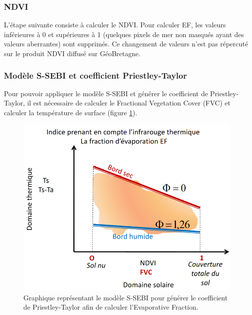 \documentclass[10pt,a4paper]{article}
\begin{document}
\subsubsection{NDVI}

L'étape suivante consiste à calculer le NDVI. Pour calculer EF, les valeurs inférieures à 0 et supérieures à 1 (quelques pixels de mer non masqués ayant des valeurs aberrantes) sont supprimés. Ce changement de valeurs n'est pas répercuté sur le produit NDVI diffusé sur GéoBretagne.

\subsubsection{Modèle S-SEBI et coefficient Priestley-Taylor}

Pour pouvoir appliquer le modèle S-SEBI et générer le coefficient de Priestley-Taylor, il est nécessaire de calculer le Fractional Vegetation Cover (FVC) et calculer la température de surface (figure \ref{graphFVCTemp}).

\begin{figure}[!h]
\centering
\includegraphics[scale=0.35]{img/graph_fvc_temp.png}
\caption{Graphique représentant le modèle S-SEBI pour générer le coefficient de Priestley-Taylor afin de calculer l'Evaporative Fraction.}
\label{graphFVCTemp}
\end{figure}
\end{document}
